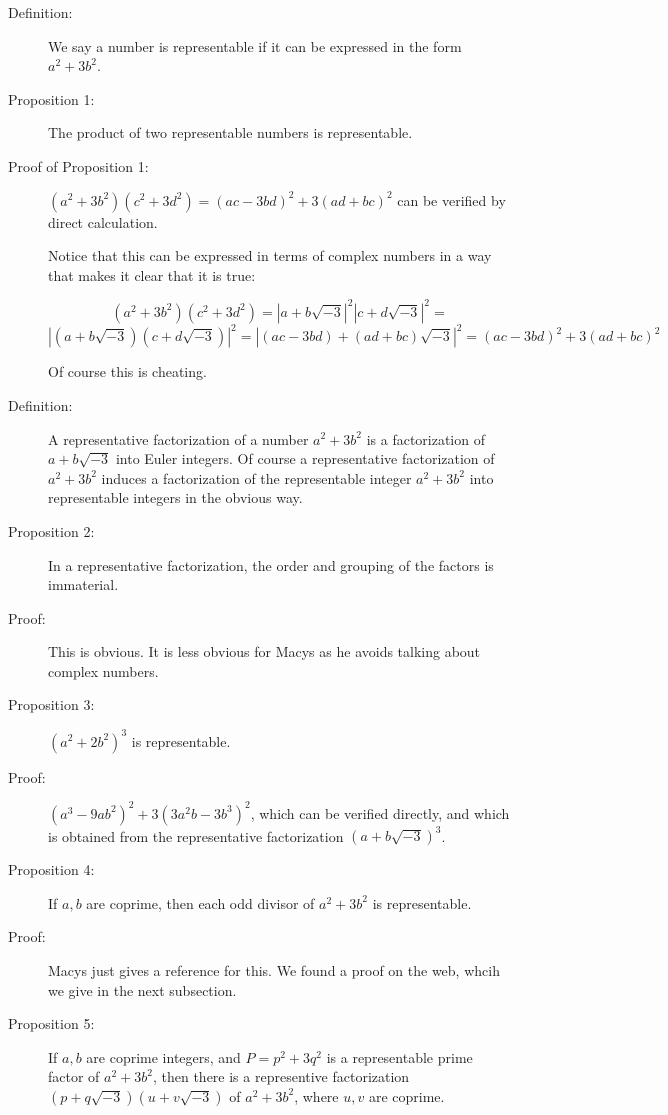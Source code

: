\documentclass[12pt]{article}
\begin{document}
\begin{description}

\item[Definition:]  We say a number is representable if it can be expressed in the form $a^2+3b^2$.

\item[Proposition 1:]  The product of two representable numbers is representable.

\item[Proof of Proposition 1:]  $(a^2+3b^2)(c^2+3d^2)=(ac-3bd)^2+3(ad+bc)^2$ can be verified by direct calculation.

Notice that this can be expressed in terms of complex numbers in a way that makes it clear that it is true:

$$(a^2+3b^2)(c^2+3d^2) = |a+b\sqrt{-3}|^2|c+d\sqrt{-3}|^2=$$ $$|(a+b\sqrt{-3})(c+d\sqrt{-3})|^2 = |(ac-3bd)+(ad+bc)\sqrt{-3}|^2=(ac-3bd)^2+3(ad+bc)^2$$

Of course this is cheating.

\item[Definition:]  A representative factorization of a number $a^2+3b^2$ is a factorization of $a+b\sqrt{-3}$ into Euler integers.  Of course
a representative factorization of $a^2+3b^2$ induces a factorization of the representable integer $a^2+3b^2$ into representable integers
in the obvious way.

\item[Proposition 2:]  In a representative factorization, the order and grouping of the factors is immaterial.

\item[Proof:]  This is obvious.  It is less obvious for Macys as he avoids talking about complex numbers.

\item[Proposition 3:]  $(a^2+2b^2)^3$ is representable.

\item[Proof:]  $(a^3-9ab^2)^2+3(3a^2b-3b^3)^2$, which can be verified directly, and which is obtained from the representative factorization $(a+b\sqrt{-3})^3$.

\item[Proposition 4:]  If $a,b$ are coprime, then each odd divisor of $a^2+3b^2$ is representable.

\item[Proof:]  Macys just gives a reference for this.   We found a proof on the web, whcih we give in the next subsection.

\item[Proposition 5:]  If $a,b$ are coprime integers, and $P=p^2+3q^2$ is a representable prime factor of $a^2+3b^2$,
then there is a representive factorization $(p + q\sqrt{-3})(u+v\sqrt{-3})$ of $a^2+3b^2$, where $u,v$ are coprime.


\end{description}
\end{document}
